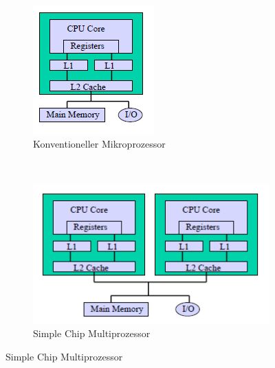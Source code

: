 \begin{figure}
	\centering
	\begin{subfigure}[b]{0.15\textwidth}
		\includegraphics[width=\textwidth]{fig/mc_one}
		\caption{Konventioneller Mikroprozessor}
		\label{fig:mc_conventional}
	\end{subfigure}
	~
	\begin{subfigure}[b]{0.27\textwidth}
		\includegraphics[width=\textwidth]{fig/mc_simple_chip}
		\caption{Simple Chip Multiprozessor}
		\label{fig:mc_simple_chip}
	\end{subfigure}

\end{figure}
